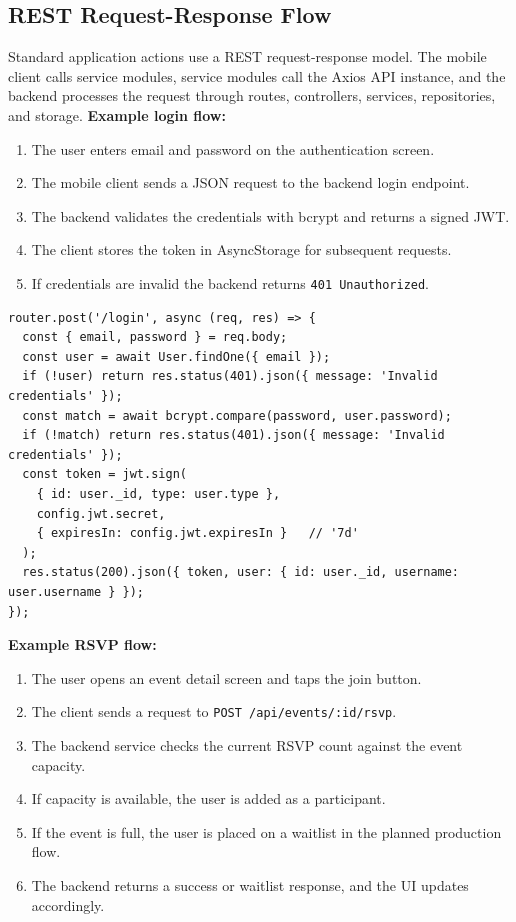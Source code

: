 \documentclass[12pt,a4paper]{article}
\begin{document}
\subsection{REST Request-Response Flow}
Standard application actions use a REST request-response model. The mobile client calls
service modules, service modules call the Axios API instance, and the backend processes
the request through routes, controllers, services, repositories, and storage.
\textbf{Example login flow:}
\begin{enumerate}
  \item The user enters email and password on the authentication screen.
  \item The mobile client sends a JSON request to the backend login endpoint.
  \item The backend validates the credentials with bcrypt and returns a signed JWT.
  \item The client stores the token in AsyncStorage for subsequent requests.
  \item If credentials are invalid the backend returns \texttt{401 Unauthorized}.
\end{enumerate}
\begin{lstlisting}[caption={authRoutes.ts -- real bcrypt + JWT login handler}]
router.post('/login', async (req, res) => {
  const { email, password } = req.body;
  const user = await User.findOne({ email });
  if (!user) return res.status(401).json({ message: 'Invalid credentials' });
  const match = await bcrypt.compare(password, user.password);
  if (!match) return res.status(401).json({ message: 'Invalid credentials' });
  const token = jwt.sign(
    { id: user._id, type: user.type },
    config.jwt.secret,
    { expiresIn: config.jwt.expiresIn }   // '7d'
  );
  res.status(200).json({ token, user: { id: user._id, username: user.username } });
});
\end{lstlisting}
\textbf{Example RSVP flow:}
\begin{enumerate}
  \item The user opens an event detail screen and taps the join button.
  \item The client sends a request to \texttt{POST /api/events/:id/rsvp}.
  \item The backend service checks the current RSVP count against the event capacity.
  \item If capacity is available, the user is added as a participant.
  \item If the event is full, the user is placed on a waitlist in the planned production flow.
  \item The backend returns a success or waitlist response, and the UI updates accordingly.
\end{enumerate}
\end{document}
